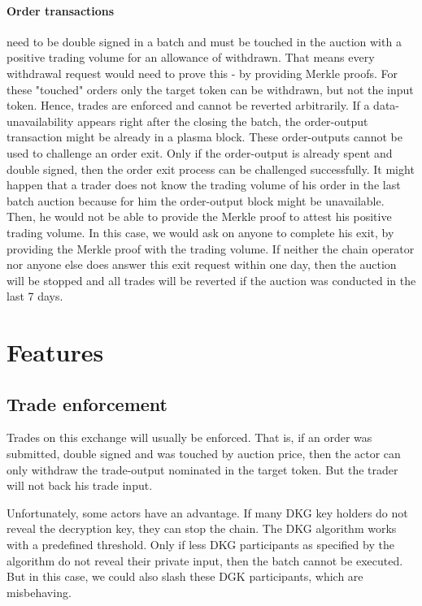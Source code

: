 \documentclass[11pt,parskip=full]{scrartcl}%
\begin{document}
\paragraph{Order transactions} need to be double signed in a batch and must be touched in the auction with a positive trading volume for an allowance of withdrawn. 
That means every withdrawal request would need to prove this - by providing Merkle proofs. 
For these  "touched" orders only the target token can be withdrawn, but not the input token. 
Hence, trades are enforced and cannot be reverted arbitrarily. 
If a data-unavailability appears right after the closing the batch, the order-output transaction might be already in a plasma block. 
These order-outputs cannot be used to challenge an order exit. 
Only if the order-output is already spent and double signed, then the order exit process can be challenged successfully. 
It might happen that a trader does not know the trading volume of his order in the last batch auction because for him the order-output block might be unavailable. 
Then, he would not be able to provide the Merkle proof to attest his positive trading volume. 
In this case, we would ask on anyone to complete his exit, by providing the Merkle proof with the trading volume. 
If neither the chain operator nor anyone else does answer this exit request within one day, then the auction will be stopped and all trades will be reverted if the auction was conducted in the last 7 days. 


\newpage

\section{Features}

\subsection{Trade enforcement}
Trades on this exchange will usually be enforced. 
That is, if an order was submitted, double signed and was touched by auction price, then the actor can only withdraw the trade-output nominated in the target token. 
But the trader will not back his trade input. 

Unfortunately, some actors have an advantage.
If many DKG key holders do not reveal the decryption key, they can stop the chain. 
The DKG algorithm works with a predefined threshold. 
Only if less DKG participants as specified by the algorithm do not reveal their private input, then the batch cannot be executed. 
But in this case, we could also slash these DGK participants, which are misbehaving. 
\end{document}
